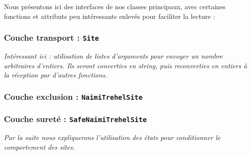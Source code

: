 Nous présentons ici des interfaces de nos classes principaux, avec certaines fonctions et attributs peu intéressants enlevés pour faciliter la lecture :

\subsubsection{Couche transport : \texttt{Site}}
 
\emph{Intéressant ici : utilisation de listes d'arguments pour envoyer un nombre arbitraires d'entiers. Ils seront converties en string, puis reconverties en entiers à la réception par d'autres fonctions.}

\subsubsection{Couche exclusion : \texttt{NaimiTrehelSite}}
 

\subsubsection{Couche sureté : \texttt{SafeNaimiTrehelSite}}
 
\emph{Par la suite nous expliquerons l'utilisation des états pour conditionner le comportement des sites.}
